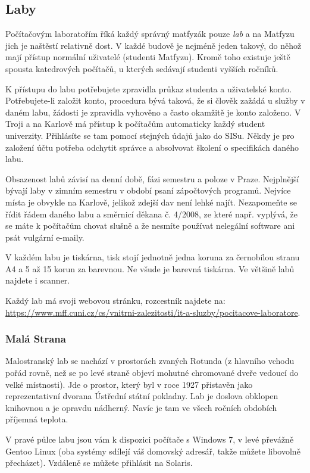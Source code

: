 \subsection{Laby}
Počítačovým laboratořím říká každý správný matfyzák pouze \textit{lab} a na
Matfyzu jich je naštěstí relativně dost. V každé budově je nejméně jeden takový,
do něhož mají přístup normální uživatelé (studenti Matfyzu).
Kromě toho existuje ještě spousta katedrových počítačů, u kterých sedávají
studenti vyšších ročníků.

K přístupu do labu potřebujete zpravidla průkaz studenta a uživatelské konto.
Potřebujete-li založit konto, procedura bývá taková, že si člověk zažádá u
služby v daném labu, žádosti je zpravidla vyhověno a často okamžitě je konto
založeno. V Troji a na Karlově má přístup k počítačům automaticky každý student
univerzity. Přihlásíte se tam pomocí stejných údajů jako do SISu. Někdy je pro
založení účtu potřeba odchytit správce a absolvovat školení o specifikách daného
labu.

Obsazenost labů závisí na denní době, fázi semestru a poloze v Praze. Nejplnější
bývají laby v zimním semestru v období psaní zápočtových programů. Nejvíce místa
je obvykle na Karlově, jelikož zdejší dav není lehké najít. Nezapomeňte se řídit řádem daného labu a
směrnicí děkana č. 4/2008, ze které např. vyplývá, že se máte k počítačům chovat
slušně a že nesmíte používat nelegální software ani psát vulgární e-maily.

V každém labu je tiskárna, tisk stojí jednotně jedna koruna za černobílou stranu
A4 a 5 až 15 korun za barevnou. Ne všude je barevná tiskárna. Ve většině labů
najdete i scanner.

Každý lab má svoji webovou stránku, rozcestník najdete na: \url{https://www.mff.cuni.cz/cs/vnitrni-zalezitosti/it-a-sluzby/pocitacove-laboratore}.


\subsubsection{Malá Strana}
Malostranský lab se nachází v prostorách zvaných Rotunda (z hlavního vchodu
pořád rovně, než se po levé straně objeví mohutné chromované dveře vedoucí do
velké místnosti). Jde o prostor, který byl v roce 1927 přistavěn jako
reprezentativní dvorana Ústřední státní pokladny. Lab je doslova obklopen
knihovnou a je opravdu nádherný. Navíc je tam ve všech ročních obdobích příjemná
teplota.

V pravé půlce labu jsou vám k dispozici počítače s Windows 7, v levé převážně
Gentoo Linux (oba systémy sdílejí váš domovský adresář, takže můžete libovolně
přecházet). Vzdáleně se můžete přihlásit na Solaris. 

